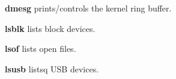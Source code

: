 \begin{compactenum}
\item [\cmdutil] \textbf{dmesg} prints/controls the kernel ring buffer.
\item [\cmdutil] \textbf{lsblk} lists block devices.
\item [\cmdvar] \textbf{lsof} lists open files.
\item [\cmdvar] \textbf{lsusb} listsq USB devices.
\end{compactenum}
